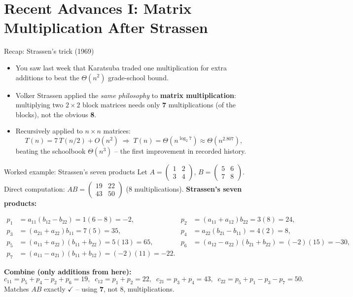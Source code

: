 \documentclass[11pt,aspectratio=169]{beamer}
\begin{document}
\section{Recent Advances I: Matrix Multiplication After Strassen}

\begin{frame}{Recap: Strassen's trick (1969)}
  \begin{itemize}
    \item You saw last week that Karatsuba traded one multiplication for extra additions
    to beat the $\Theta(n^2)$ grade-school bound.
    \item Volker Strassen applied the \emph{same philosophy} to \textbf{matrix
    multiplication}: multiplying two $2\times 2$ block matrices needs only \textbf{7}
    multiplications (of the blocks), not the obvious \textbf{8}.
    \item Recursively applied to $n\times n$ matrices:
    \[
      T(n) = 7\,T(n/2) + O(n^2) \;\Longrightarrow\; T(n) = \Theta(n^{\log_2 7}) \approx
      \Theta(n^{2.807}),
    \]
    beating the schoolbook $\Theta(n^3)$ -- the first improvement in recorded history.
  \end{itemize}
\end{frame}

\begin{frame}{Worked example: Strassen's seven products}
  Let $A = \left(\begin{smallmatrix}1&2\\3&4\end{smallmatrix}\right)$,
  $B = \left(\begin{smallmatrix}5&6\\7&8\end{smallmatrix}\right)$. Direct computation:
  $AB = \left(\begin{smallmatrix}19&22\\43&50\end{smallmatrix}\right)$ (8 multiplications).
  \textbf{Strassen's seven products:}
  \begin{small}
  \begin{align*}
    p_1 &= a_{11}(b_{12}-b_{22}) = 1(6-8) = -2, &
    p_2 &= (a_{11}+a_{12})b_{22} = 3(8) = 24, \\
    p_3 &= (a_{21}+a_{22})b_{11} = 7(5) = 35, &
    p_4 &= a_{22}(b_{21}-b_{11}) = 4(2) = 8, \\
    p_5 &= (a_{11}+a_{22})(b_{11}+b_{22}) = 5(13) = 65, &
    p_6 &= (a_{12}-a_{22})(b_{21}+b_{22}) = (-2)(15) = -30, \\
    p_7 &= (a_{11}-a_{21})(b_{11}+b_{12}) = (-2)(11) = -22. & &
  \end{align*}
  \end{small}
  \textbf{Combine (only additions from here):}
  \[
    c_{11} = p_5{+}p_4{-}p_2{+}p_6 = 19, \;\;
    c_{12} = p_1{+}p_2 = 22, \;\;
    c_{21} = p_3{+}p_4 = 43, \;\;
    c_{22} = p_5{+}p_1{-}p_3{-}p_7 = 50.
  \]
  Matches $AB$ exactly $\checkmark$ -- using \textbf{7}, not 8, multiplications.
\end{frame}
\end{document}
